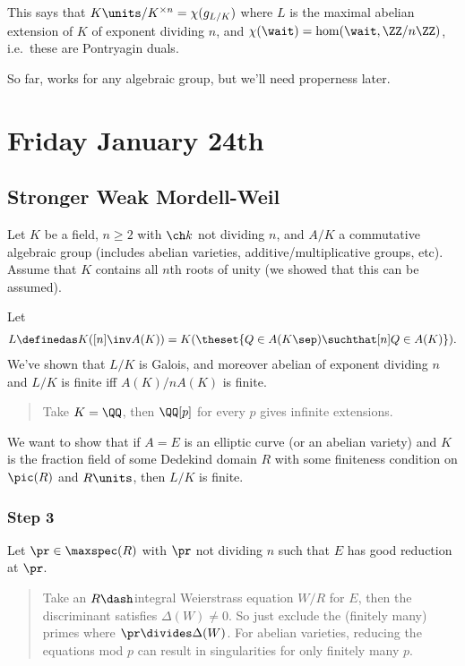 This says that \(K\units/K^{\times n} = \chi(g_{L/K})\) where \(L\) is
the maximal abelian extension of \(K\) of exponent dividing \(n\), and
\(\chi(\wait) = \hom(\wait, \ZZ/n\ZZ)\), i.e.~these are Pontryagin
duals.

So far, works for any algebraic group, but we'll need properness later.

\hypertarget{friday-january-24th}{%
\section{Friday January 24th}\label{friday-january-24th}}

\hypertarget{stronger-weak-mordell-weil-1}{%
\subsection{Stronger Weak
Mordell-Weil}\label{stronger-weak-mordell-weil-1}}

Let \(K\) be a field, \(n\geq 2\) with \(\ch k\) not dividing \(n\), and
\(A/K\) a commutative algebraic group (includes abelian varieties,
additive/multiplicative groups, etc). Assume that \(K\) contains all
\(n\)th roots of unity (we showed that this can be assumed).

Let
\begin{align*}L \definedas K([n] \inv A(K)) = K(\theset{Q \in A(K\sep) \suchthat [n] Q \in A(K)}).\end{align*}
We've shown that \(L/K\) is Galois, and moreover abelian of exponent
dividing \(n\) and \(L/K\) is finite iff \(A(K) / n A(K)\) is finite.

\begin{quote}
Take \(K = \QQ\), then \(\QQ[p]\) for every \(p\) gives infinite
extensions.
\end{quote}

We want to show that if \(A=E\) is an elliptic curve (or an abelian
variety) and \(K\) is the fraction field of some Dedekind domain \(R\)
with some finiteness condition on \(\pic(R)\) and \(R\units\), then
\(L/K\) is finite.

\hypertarget{step-3-1}{%
\subsubsection{Step 3}\label{step-3-1}}

Let \(\pr \in \maxspec(R)\) with \(\pr\) not dividing \(n\) such that
\(E\) has good reduction at \(\pr\).

\begin{quote}
Take an \(R\dash\)integral Weierstrass equation \(W/R\) for \(E\), then
the discriminant satisfies \(\Delta(W) \neq 0\). So just exclude the
(finitely many) primes where \(\pr \divides \Delta(W)\). For abelian
varieties, reducing the equations mod \(p\) can result in singularities
for only finitely many \(p\).
\end{quote}

